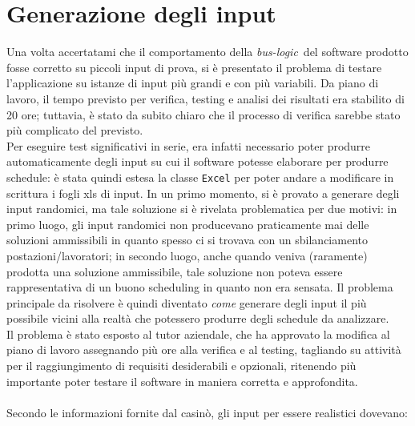 \section{Generazione degli input}
Una volta accertatami che il comportamento della \emph{\gls{bus-logic}}\glsfirstoccur\ del software prodotto fosse corretto su piccoli input di prova, si è presentato il problema di testare l'applicazione su istanze di input più grandi e con più variabili. Da piano di lavoro, il tempo previsto per verifica, testing e analisi dei risultati era stabilito di 20 ore; tuttavia, è stato da subito chiaro che il processo di verifica sarebbe stato più complicato del previsto.\\
Per eseguire test significativi in serie, era infatti necessario poter produrre automaticamente degli input su cui il software potesse elaborare per produrre schedule: è stata quindi estesa la classe \texttt{Excel} per poter andare a modificare in scrittura i fogli xls di input. In un primo momento, si è provato a generare degli input randomici, ma tale soluzione si è rivelata problematica per due motivi: in primo luogo, gli input randomici non producevano praticamente mai delle soluzioni ammissibili in quanto spesso ci si trovava con un sbilanciamento postazioni/lavoratori; in secondo luogo, anche quando veniva (raramente) prodotta una soluzione ammissibile, tale soluzione non poteva essere rappresentativa di un buono scheduling in quanto non era sensata. Il problema principale da risolvere è quindi diventato \textit{come} generare degli input il più possibile vicini alla realtà che potessero produrre degli schedule da analizzare.\\
Il problema è stato esposto al tutor aziendale, che ha approvato la modifica al piano di lavoro assegnando più ore alla verifica e al testing, tagliando su attività per il raggiungimento di requisiti desiderabili e opzionali, ritenendo più importante poter testare il software in maniera corretta e approfondita. \\
\\
Secondo le informazioni fornite dal casinò, gli input per essere realistici dovevano:
